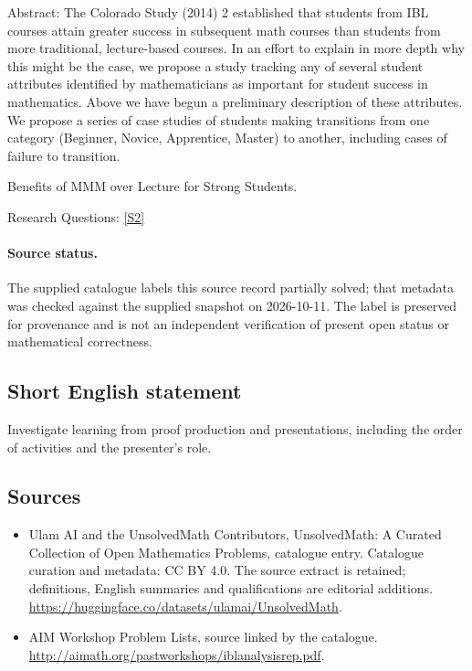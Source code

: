 \documentclass[11pt]{article}
\begin{document}
Abstract: The Colorado Study (2014) 2 established that students from IBL courses attain greater success in subsequent math courses than students from more traditional, lecture-based courses. In an effort to explain in more depth why this might be the case, we propose a study tracking any of several student attributes identified by mathematicians as important for student success in mathematics. Above we have begun a preliminary description of these attributes. We propose a series of case studies of students making transitions from one category (Beginner, Novice, Apprentice, Master) to another, including cases of failure to transition.

Benefits of MMM over Lecture for Strong Students.

Research Questions: \href{http://aimath.org/pastworkshops/iblanalysisrep.pdf}{[S2]}
\paragraph{Source status.}
The supplied catalogue labels this source record partially solved; that metadata was checked against the supplied snapshot on 2026-10-11. The label is preserved for provenance and is not an independent verification of present open status or mathematical correctness.
\subsection{Short English statement}
Investigate learning from proof production and presentations, including the order of activities and the presenter's role.
\subsection{Sources}
\begin{itemize}
\item[S1] Ulam AI and the UnsolvedMath Contributors, UnsolvedMath: A Curated Collection of Open Mathematics Problems, catalogue entry. Catalogue curation and metadata: CC BY 4.0. The source extract is retained; definitions, English summaries and qualifications are editorial additions.
\url{https://huggingface.co/datasets/ulamai/UnsolvedMath}.
\item[S2] AIM Workshop Problem Lists, source linked by the catalogue.
\url{http://aimath.org/pastworkshops/iblanalysisrep.pdf}.
\end{itemize}
\end{document}
